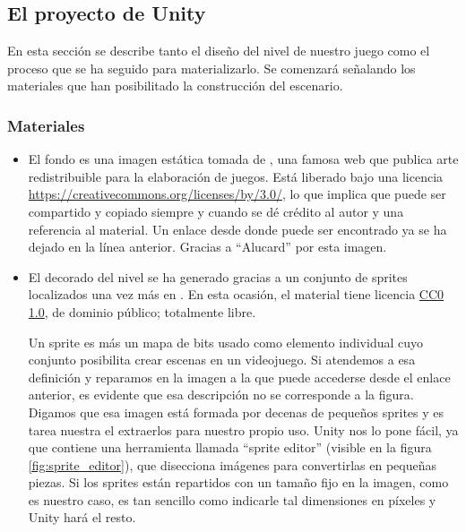 \subsection{El proyecto de Unity}
En esta sección se describe tanto el diseño del nivel de nuestro juego como el proceso que se ha seguido para materializarlo. Se comenzará señalando los materiales que han posibilitado la construcción del escenario.

\subsubsection{Materiales}
\begin{itemize}
\item El fondo es una imagen estática tomada de , una famosa web que publica arte redistribuible para la elaboración de juegos. Está liberado bajo una licencia	\href{CC 3.0}{https://creativecommons.org/licenses/by/3.0/}, lo que implica que puede ser compartido y copiado siempre y cuando se dé crédito al autor y una referencia al material. Un enlace desde donde puede ser encontrado ya se ha dejado en la línea anterior. Gracias a ``Alucard'' por esta imagen.
\item El decorado del nivel se ha generado gracias a un conjunto de sprites localizados una vez más en . En esta ocasión, el material tiene licencia \href{https://creativecommons.org/publicdomain/zero/1.0/}{CC0 1.0}, de dominio público; totalmente libre.

Un sprite es más un mapa de bits usado como elemento individual cuyo conjunto posibilita crear escenas en un videojuego. Si atendemos a esa definición y reparamos en la imagen a la que puede accederse desde el enlace anterior, es evidente que esa descripción no se corresponde a la figura. Digamos que esa imagen está formada por decenas de pequeños sprites y es tarea nuestra el extraerlos para nuestro propio uso. Unity nos lo pone fácil, ya que contiene una herramienta llamada ``sprite editor'' (visible en la figura \ref{fig:sprite_editor}), que disecciona imágenes para convertirlas en pequeñas piezas. Si los sprites están repartidos con un tamaño fijo en la imagen, como es nuestro caso, es tan sencillo como indicarle tal dimensiones en píxeles y Unity hará el resto.


\end{itemize}
